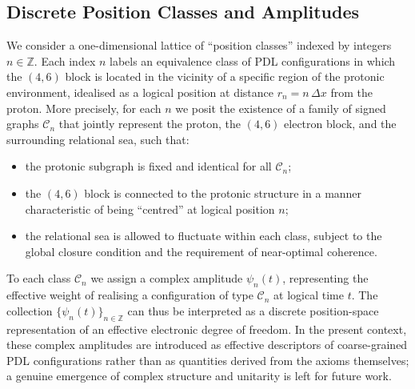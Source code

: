 \documentclass[11pt,a4paper]{article}
\begin{document}
\subsection{Discrete Position Classes and Amplitudes}

We consider a one-dimensional lattice of ``position classes'' indexed by integers $n \in \mathbb{Z}$. Each index $n$ labels an equivalence class of PDL configurations in which the $(4,6)$ block is located in the vicinity of a specific region of the protonic environment, idealised as a logical position at distance $r_n = n\,\Delta x$ from the proton. More precisely, for each $n$ we posit the existence of a family of signed graphs $\mathcal{C}_n$ that jointly represent the proton, the $(4,6)$ electron block, and the surrounding relational sea, such that:
\begin{itemize}
\item the protonic subgraph is fixed and identical for all $\mathcal{C}_n$;
\item the $(4,6)$ block is connected to the protonic structure in a manner characteristic of being ``centred'' at logical position $n$;
\item the relational sea is allowed to fluctuate within each class, subject to the global closure condition and the requirement of near-optimal coherence.
\end{itemize}
To each class $\mathcal{C}_n$ we assign a complex amplitude $\psi_n(t)$, representing the effective weight of realising a configuration of type $\mathcal{C}_n$ at logical time $t$. The collection $\{\psi_n(t)\}_{n\in\mathbb{Z}}$ can thus be interpreted as a discrete position-space representation of an effective electronic degree of freedom. In the present context, these complex amplitudes are introduced as effective descriptors of coarse-grained PDL configurations rather than as quantities derived from the axioms themselves; a genuine emergence of complex structure and unitarity is left for future work.

\medskip
\end{document}
